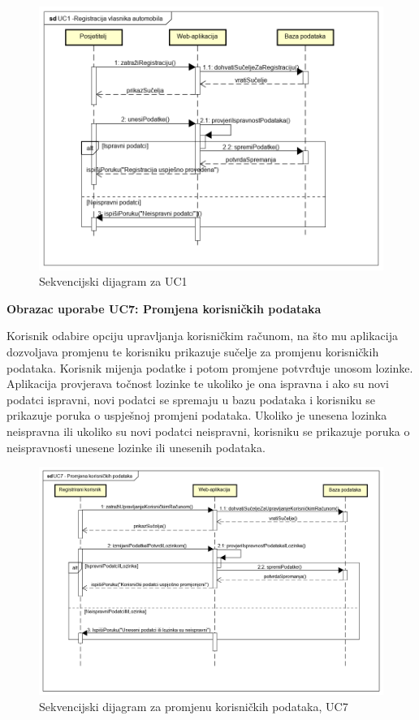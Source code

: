 \begin{figure}[H]
	\includegraphics[width=\linewidth]{dijagrami/seq-dia-UC1.png}
	\centering
	\caption{Sekvencijski dijagram za UC1}
	\label{fig:sequence-diagram1}
\end{figure}

\textbf{Obrazac uporabe UC7: Promjena korisničkih podataka}

\noindent Korisnik odabire opciju upravljanja korisničkim računom, na što mu aplikacija dozvoljava promjenu te korisniku prikazuje sučelje za promjenu korisničkih podataka. Korisnik mijenja podatke i potom promjene potvrđuje unosom lozinke. Aplikacija provjerava točnost lozinke te ukoliko je ona ispravna i ako su novi podatci ispravni, novi podatci se spremaju u bazu podataka i korisniku se prikazuje poruka o uspješnoj promjeni podataka. Ukoliko je unesena lozinka neispravna ili ukoliko su novi podatci neispravni, korisniku se prikazuje poruka o neispravnosti unesene lozinke ili unesenih podataka.

\begin{figure}[H]
	\includegraphics[width=\linewidth]{dijagrami/seq-dia-UC7.png}
	\centering
	\caption{Sekvencijski dijagram za promjenu korisničkih podataka, UC7}
	\label{fig:sequence-diagram1}
\end{figure}

